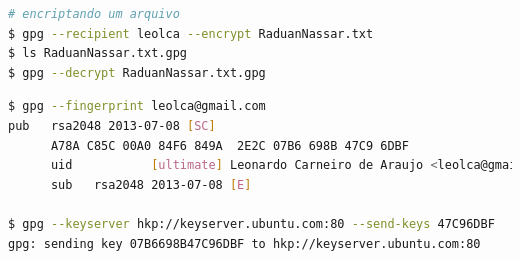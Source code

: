 \begin{frame}
\framebreak 
\begin{lstlisting}[language=bash, label=lst-pgp-ex04, caption={Encriptar um arquivo.}, postbreak=\mbox{$\hookrightarrow$\space}, basicstyle=\fontsize{8}{10}\selectfont\ttfamily]
# encriptando um arquivo 
$ gpg --recipient leolca --encrypt RaduanNassar.txt
$ ls RaduanNassar.txt.gpg
$ gpg --decrypt RaduanNassar.txt.gpg
\end{lstlisting}

\framebreak 
\begin{lstlisting}[language=bash, label=lst-pgp-ex05, caption={Enviando a chave para um servidor de chaves.}, postbreak=\mbox{$\hookrightarrow$\space}, basicstyle=\fontsize{8}{10}\selectfont\ttfamily]
$ gpg --fingerprint leolca@gmail.com
pub   rsa2048 2013-07-08 [SC]
      A78A C85C 00A0 84F6 849A  2E2C 07B6 698B 47C9 6DBF
      uid           [ultimate] Leonardo Carneiro de Araujo <leolca@gmail.com>
      sub   rsa2048 2013-07-08 [E]

$ gpg --keyserver hkp://keyserver.ubuntu.com:80 --send-keys 47C96DBF
gpg: sending key 07B6698B47C96DBF to hkp://keyserver.ubuntu.com:80
\end{lstlisting}

\end{frame}



